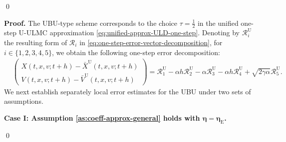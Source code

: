 \documentclass[12pt]{article}
\newenvironment{redtext}
  {\color{black}\ignorespaces}
  {\ignorespacesafterend}
\numberwithin{equation}{section}
\renewenvironment{proof}%
  {\begin{trivlist}%
   \item[]\ignorespaces}%
  {\qed\end{trivlist}}
\begin{document}
\begin{redtext}
\begin{proof}
\end{proof}
\fi

\begin{proof}
\textbf{Proof.}
The UBU-type scheme corresponds to the choice
$\tau=\frac12$ in the unified one-step U-ULMC approximation
\eqref{eq:unified-approx-ULD-one-step}. Denoting by
$\mathcal R_i^{\mathrm U}$ the resulting form of $\mathcal R_i$
in \eqref{eq:one-step-error-vector-decomposition}, for
$i\in\{1,2,3,4,5\}$, we obtain the following one-step error
decomposition:
\begin{align}
&
\left(
\begin{aligned}
X(t,x,v;t+h)-\bar X^{\mathrm U}(t,x,v;t+h)
\\
V(t,x,v;t+h)-\bar V^{\mathrm U}(t,x,v;t+h)
\end{aligned}
\right)
=
\mathcal R_1^{\mathrm U}
-\alpha h\mathcal R_2^{\mathrm U}
-\alpha\mathcal R_3^{\mathrm U}
-\alpha h\mathcal R_4^{\mathrm U}
+\sqrt{2\gamma\alpha}\mathcal R_5^{\mathrm U}.
\label{eq:UBU-error-decomposition}
\end{align}
We next establish separately local error estimates for the UBU
under two sets of assumptions.

\textbf{Case I: Assumption \ref{as:coeff-approx-general} holds with $\boldsymbol{\eta} = \boldsymbol{\eta}_\mathrm{E}$.}


\end{proof}
\end{redtext}
\end{document}
